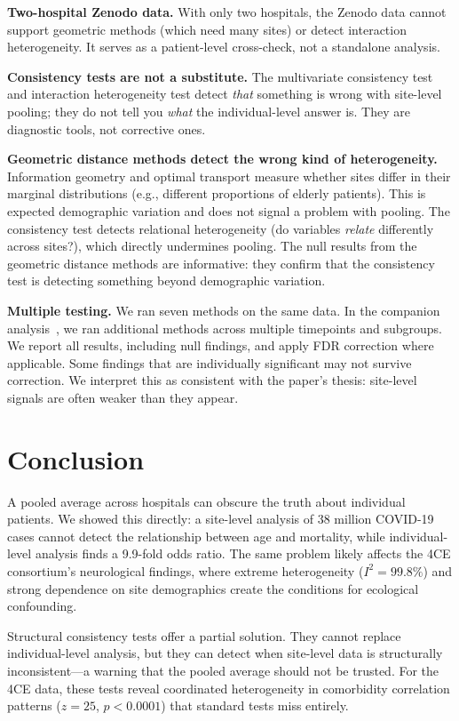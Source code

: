 \documentclass{article}
\begin{document}
\textbf{Two-hospital Zenodo data.}  With only two hospitals, the Zenodo data
cannot support geometric methods (which need many sites) or detect interaction
heterogeneity.  It serves as a patient-level cross-check, not a standalone
analysis.

\textbf{Consistency tests are not a substitute.}  The multivariate consistency
test and interaction heterogeneity test detect \emph{that} something is wrong
with site-level pooling; they do not tell you \emph{what} the
individual-level answer is.  They are diagnostic tools, not corrective ones.

\textbf{Geometric distance methods detect the wrong kind of heterogeneity.}
Information geometry and optimal transport measure whether sites differ in
their marginal distributions (e.g., different proportions of elderly patients).
This is expected demographic variation and does not signal a problem with
pooling.  The consistency test detects relational heterogeneity (do variables
\emph{relate} differently across sites?), which directly undermines pooling.
The null results from the geometric distance methods are informative: they
confirm that the consistency test is detecting something beyond demographic
variation.

\textbf{Multiple testing.}  We ran seven methods on the same data.  In the
companion analysis~\cite{tower2026sitelevel}, we ran additional methods across multiple timepoints
and subgroups.  We report all results, including null findings, and apply
FDR correction where applicable.  Some findings that are individually
significant may not survive correction.  We interpret this as consistent with
the paper's thesis: site-level signals are often weaker than they appear.


\section{Conclusion}

A pooled average across hospitals can obscure the truth about individual
patients.  We showed this directly: a site-level analysis of 38 million
COVID-19 cases cannot detect the relationship between age and mortality, while
individual-level analysis finds a 9.9-fold odds ratio.  The same problem
likely affects the 4CE consortium's neurological findings, where extreme
heterogeneity ($I^2 = 99.8\%$) and strong dependence on site demographics
create the conditions for ecological confounding.

Structural consistency tests offer a partial solution.  They cannot replace
individual-level analysis, but they can detect when site-level data is
structurally inconsistent---a warning that the pooled average should not be
trusted.  For the 4CE data, these tests reveal coordinated heterogeneity
in comorbidity correlation patterns ($z = 25$, $p < 0.0001$) that standard
tests miss entirely.
\end{document}

